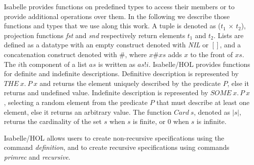 Isabelle provides functions on predefined types to access their members or to provide additional operations over them. In the following we describe those functions and types that we use along this work. A tuple is denoted as (\emph{$t_1$} $\times$ \emph{$t_2$}), projection functions \emph{fst} and \emph{snd} respectively return elements $t_1$ and $t_2$. Lists are defined as a datatype with an empty construct denoted with \emph{NIL} or $[]$, and a concatenation construct denoted with $\#$, where $x\#xs$ adds $x$ to the front of $xs$. The $i$th component of a list $as$ is written as $as!i$. Isabelle/HOL provides functions for definite and indefinite descriptions. Definitive description is represented by $THE\ x.\ P\ x$ and returns the element uniquely described by the predicate $P$, else it returns and undefined value. Indefinite description is represented by $SOME\ x.\, P\ x$, selecting a random element from the predicate $P$ that must describe at least one element, else it returns an arbitrary value. The function $Card\ s$, denoted as $|s|$, returns the cardinality of the set $s$ when $s$ is finite, or $0$ when $s$ is infinite.

Isabelle/HOL allows users to create non-recursive specifications using the command \emph{definition}, and to create recursive specifications using commands \emph{primrec} and \emph{recursive}.
